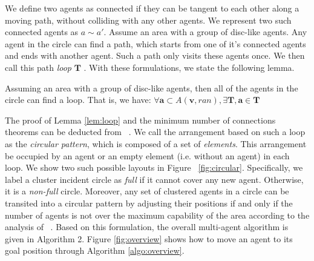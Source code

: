 We define two agents as connected if they can be tangent to each other along a moving path, without colliding with any other agents. We represent two such connected agents as $a \sim a'$. Assume an area with a group of disc-like agents.  
Any agent in the circle can find a path, which starts from one of it's connected agents and ends with another agent. Such a path only visits these agents once. We then call this path {\em loop} $\mathbf{T}$ . 
With these formulations, we state the following lemma. 

\vspace*{0.05in}
\begin{lemma}
Assuming an area with a group of disc-like agents, then all of the agents in the circle can find a loop. 
That is, we have: $ \forall{\mathbf{a}} \subset A(\mathbf v,ran), \exists{\mathbf{T}}, \mathbf{a} \in \mathbf{T}$
\label{lem:loop}
\end{lemma}
\vspace*{0.05in}

The proof of Lemma \ref{lem:loop} and the minimum number of connections theorems can be deducted from ~\cite{graham1998dense}.
We call the arrangement based on such a loop as the \emph{circular pattern}, which is composed of a set of \emph{elements}. This arrangement be occupied by an agent or an empty element (i.e. without an agent) in each loop.
We show two such possible layouts in Figure ~\ref{fig:circular}. 
Specifically, we label a cluster incident circle as \emph{full} if it cannot cover any new agent. 
Otherwise, it is a \emph{non-full} circle. 
Moreover, any set of clustered agents in a circle can be transited into a circular pattern by adjusting their positions if and only if the number of agents is not over the maximum capability of the area according to the analysis of ~\cite{graham1998dense}.
Based on this formulation, the overall multi-agent algorithm is given in Algorithm 2. 
Figure \ref{fig:overview} shows how to move an agent to its goal position through Algorithm \ref{algo:overview}.

